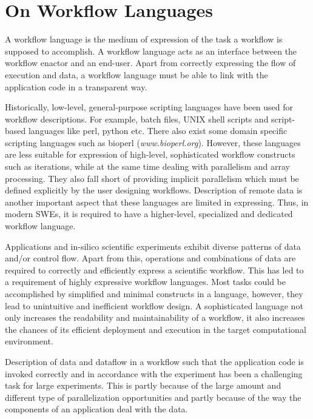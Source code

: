 
\section{On Workflow Languages} \label{sec:lang}
A workflow language is the medium of expression of the task a workflow is
supposed to accomplish. A workflow language acts as an interface between the
workflow enactor and an end-user. Apart from correctly expressing the flow of
execution and data, a workflow language must be able to link with the
application code in a transparent way.

Historically, low-level, general-purpose scripting languages have been used for
workflow descriptions. For example, batch files, UNIX shell scripts and
script-based languages like perl, python \cite{begeman-belikov-etal:2010} etc.
There also exist some domain specific scripting languages such as bioperl
(\textit{www.bioperl.org}). However, these languages are less suitable for
expression of high-level, sophisticated workflow constructs such as iterations,
while at the same time dealing with parallelism and array processing. They also
fall short of providing implicit parallelism which must be defined explicitly by
the user designing workflows. Description of remote data is another important
aspect that these languages are limited in expressing. Thus, in modern SWEs, it
is required to have a higher-level, specialized and dedicated workflow
language.

Applications and in-silico scientific experiments exhibit diverse patterns of
data and/or control flow. Apart from this, operations and combinations of data
are required to correctly and efficiently express a scientific workflow. This
has led to a requirement of highly expressive workflow languages. Most tasks
could be accomplished by simplified and minimal constructs in a language,
however, they lead to unintuitive and inefficient workflow design. A
sophisticated language not only increases the readability and maintainability
of a workflow, it also increases the chances of its efficient deployment and
execution in the target computational environment.

Description of data and dataflow in a workflow such that the application code
is invoked correctly and in accordance with the experiment has been a
challenging task for large experiments. This is partly because of the large
amount and different type of parallelization opportunities and partly because
of the way the components of an application deal with the data.

